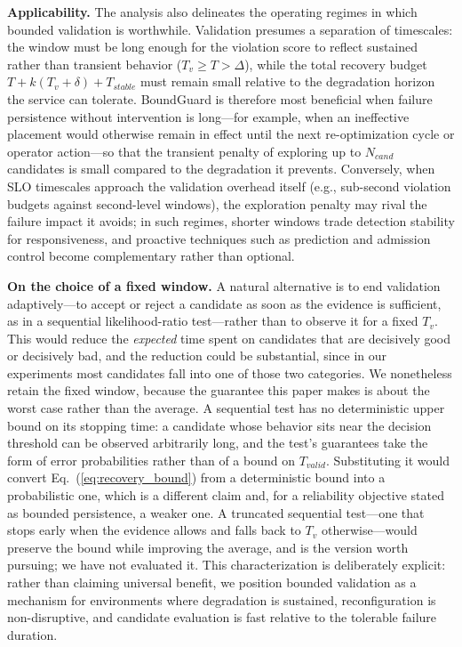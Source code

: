 \documentclass[conference]{IEEEtran}
\begin{document}
\noindent\textbf{Applicability.}
The analysis also delineates the operating regimes in which bounded validation is worthwhile.
Validation presumes a separation of timescales: the window must be long enough for the violation score to reflect sustained rather than transient behavior ($T_v \ge T > \Delta$), while the total recovery budget $T + k(T_v + \delta) + T_{stable}$ must remain small relative to the degradation horizon the service can tolerate.
BoundGuard is therefore most beneficial when failure persistence without intervention is long---for example, when an ineffective placement would otherwise remain in effect until the next re-optimization cycle or operator action---so that the transient penalty of exploring up to $N_{cand}$ candidates is small compared to the degradation it prevents.
Conversely, when SLO timescales approach the validation overhead itself (e.g., sub-second violation budgets against second-level windows), the exploration penalty may rival the failure impact it avoids; in such regimes, shorter windows trade detection stability for responsiveness, and proactive techniques such as prediction and admission control become complementary rather than optional.

\noindent\textcolor{navyblue}{\textbf{On the choice of a fixed window.} A natural alternative is to end validation adaptively---to accept or reject a candidate as soon as the evidence is sufficient, as in a sequential likelihood-ratio test---rather than to observe it for a fixed $T_v$. This would reduce the \emph{expected} time spent on candidates that are decisively good or decisively bad, and the reduction could be substantial, since in our experiments most candidates fall into one of those two categories. We nonetheless retain the fixed window, because the guarantee this paper makes is about the worst case rather than the average. A sequential test has no deterministic upper bound on its stopping time: a candidate whose behavior sits near the decision threshold can be observed arbitrarily long, and the test's guarantees take the form of error probabilities rather than of a bound on $T_{valid}$. Substituting it would convert Eq.~(\ref{eq:recovery_bound}) from a deterministic bound into a probabilistic one, which is a different claim and, for a reliability objective stated as bounded persistence, a weaker one. A truncated sequential test---one that stops early when the evidence allows and falls back to $T_v$ otherwise---would preserve the bound while improving the average, and is the version worth pursuing; we have not evaluated it.}
This characterization is deliberately explicit: rather than claiming universal benefit, we position bounded validation as a mechanism for environments where degradation is sustained, reconfiguration is non-disruptive, and candidate evaluation is fast relative to the tolerable failure duration.
\end{document}
